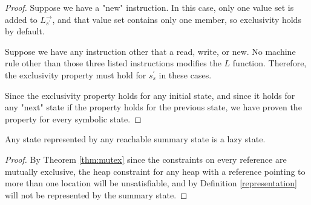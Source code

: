 \begin{proof}
Suppose we have a "new" instruction. In this case, only one value set is added to $L_{s^\prime}^\rightarrow$, and that value set contains only one member, so exclusivity holds by default.

Suppose we have any instruction other that a read, write, or new. No machine rule other than those three listed instructions modifies the $L$ function. Therefore, the exclusivity property must hold for $s_s^\prime$ in these cases.

Since the exclusivity property holds for any initial state, and since it holds for any "next" state if the property holds for the previous state, we have proven the property for every symbolic state.
\end{proof}

\begin{corollary}
Any state represented by any reachable summary state is a lazy state.
\end{corollary}

\begin{proof}
By Theorem \ref{thm:mutex} since the constraints on every reference are mutually exclusive, the heap constraint for any heap with a reference pointing to more than one location will be unsatisfiable, and by Definition \ref{representation} will not be represented by the summary state.
\end{proof}


